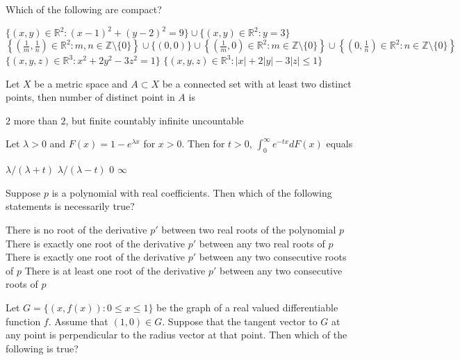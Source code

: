 \documentclass[10pt]{exam}
\newcommand{\R}{\ensuremath{\mathbb{R}}}
\newcommand{\Z}{\ensuremath{\mathbb{Z}}}
\begin{document}
\begin{questions}
\question 
Which of the following are compact?

\begin{checkboxes}
\choice $\{(x,y) \in \R^2: (x-1)^2 + (y-2)^2 = 9 \} \cup \{(x,y) \in \R^2: y = 3 \} $
\choice $\left \{ \left ( \frac{1}{m},\frac{1}{n} \right ) \in \R^2 : m, n \in \Z \setminus \{0\} \right \} \cup \{(0,0)\} \cup \left \{ \left ( \frac{1}{m}, 0  \right ) \in \R^2 : m \in \Z \setminus \{0\} \right \} \cup \left \{ \left ( 0,\frac{1}{n} \right ) \in \R^2 : n \in \Z \setminus \{0\} \right \}$
\choice $\{(x,y,z) \in \R^3: x^2 + 2y^2 - 3z^2 = 1\}$
\choice $\{(x,y,z) \in \R^3: |x| + 2|y| - 3|z| \leq  1\}$
\end{checkboxes}

\question
Let $X$ be a metric space and $A \subset X$ be a connected set with at least two distinct points, then number of distinct point in $A$ is

\begin{oneparchoices}
\choice $2$
\choice more than $2$, but finite
\choice countably infinite
\choice uncountable
\end{oneparchoices}

\question
Let $\lambda > 0 $ and $F(x) = 1-e^{\lambda x}$ for $x>0$. Then for $t>0$, $\int_0^{\infty} e^{-tx} dF(x)$ equals

\begin{oneparchoices}
\choice $\lambda/(\lambda + t)$
\choice $\lambda/(\lambda - t)$
\choice $0$
\choice $\infty$
\end{oneparchoices}


\question
Suppose $p$ is a polynomial with real coefficients. Then which of the following statements is necessarily true?

\begin{choices}
\choice There is no root of the derivative $p'$ between two real roots of the polynomial $p$ 
\choice There is exactly one root of the derivative $p'$ between any two real roots of $p$ 
\choice There is exactly one root of the derivative $p'$ between any two consecutive  roots of $p$ 
\choice There is at least  one root of the derivative $p'$ between any two consecutive  roots of $p$ 
\end{choices}

\question 
Let $G = \{(x, f(x)): 0 \leq x \leq 1 \} $ be the graph of a real valued differentiable function $f$. Assume that $(1,0) \in G$. Suppose that the tangent vector to $G$ at any point is perpendicular to the radius vector at that point. Then which of the following is true?


\end{questions}
\end{document}

